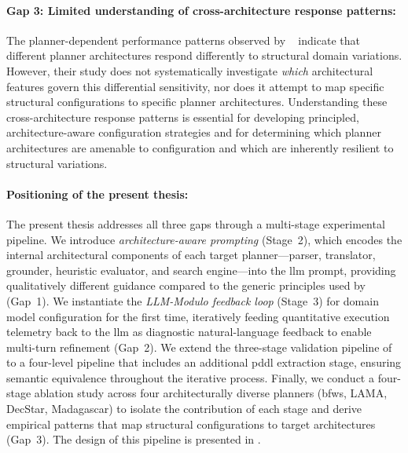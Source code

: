 \paragraph{Gap 3: Limited understanding of cross-architecture response patterns:}
The planner-dependent performance patterns observed by \citeauthor{Georgievski2025}~\cite{Georgievski2025} indicate that different planner architectures respond differently to structural domain variations.
However, their study does not systematically investigate \emph{which} architectural features govern this differential sensitivity, nor does it attempt to map specific structural configurations to specific planner architectures.
Understanding these cross-architecture response patterns is essential for developing principled, architecture-aware configuration strategies and for determining which planner architectures are amenable to configuration and which are inherently resilient to structural variations.

\paragraph{Positioning of the present thesis:}
The present thesis addresses all three gaps through a multi-stage experimental pipeline.
We introduce \emph{architecture-aware prompting} (Stage~2), which encodes the internal architectural components of each target planner---parser, translator, grounder, heuristic evaluator, and search engine---into the \gls{llm} prompt, providing qualitatively different guidance compared to the generic principles used by \citeauthor{Georgievski2025}~\cite{Georgievski2025} (Gap~1).
We instantiate the \emph{LLM-Modulo feedback loop} (Stage~3) for domain model configuration for the first time, iteratively feeding quantitative execution telemetry back to the \gls{llm} as diagnostic natural-language feedback to enable multi-turn refinement (Gap~2).
We extend the three-stage validation pipeline of \citeauthor{Georgievski2025}~\cite{Georgievski2025} to a four-level pipeline that includes an additional \gls{pddl} extraction stage, ensuring semantic equivalence throughout the iterative process.
Finally, we conduct a four-stage ablation study across four architecturally diverse planners (\gls{bfws}, LAMA, DecStar, Madagascar) to isolate the contribution of each stage and derive empirical patterns that map structural configurations to target architectures (Gap~3).
The design of this pipeline is presented in .


